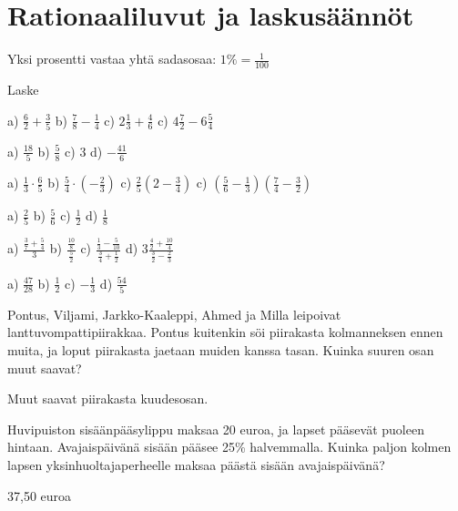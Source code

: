 \chapter{Rationaaliluvut ja laskusäännöt}




Yksi prosentti vastaa yhtä sadasosaa: $1 \% = \frac{1}{100}$

Laske %
\begin{tehtava}
a) $\frac{6}{2} + \frac{3}{5}$
b) $\frac{7}{8} - \frac{1}{4}$
c) $2 \frac{1}{3} + \frac{4}{6}$
c) $4 \frac{7}{2} - 6 \frac{5}{4}$
\begin{vastaus}
a) $\frac{18}{5}$
b) $\frac{5}{8}$
c) $3$
d) $-\frac{41}{6}$
\end{vastaus}
\end{tehtava}

\begin{tehtava}
a) $\frac{1}{3} \cdot \frac{6}{5}$
b) $\frac{5}{4} \cdot (-\frac{2}{3})$
c) $\frac{2}{5} (2 - \frac{3}{4})$
c) $(\frac{5}{6} - \frac{1}{3})(\frac{7}{4} - \frac{3}{2})$
\begin{vastaus}
a) $\frac{2}{5}$
b) $\frac{5}{6}$
c) $\frac{1}{2}$
d) $\frac{1}{8}$
\end{vastaus}
\end{tehtava}

\begin{tehtava} %
a) $ \frac{\frac{3}{7} + \frac{5}{4}}{3}$
b) $ \frac{\frac{10}{8}}{\frac{5}{2}}$
c) $ \frac{\frac{1}{3} - \frac{5}{10}}{\frac{3}{4} + \frac{1}{2}}$
d) $ 3\frac{\frac{4}{2} + \frac{10}{4}}{\frac{3}{2} - \frac{2}{3}}$
\begin{vastaus}
a) $\frac{47}{28}$
b) $\frac{1}{2}$
c) $-\frac{1}{3}$
d) $\frac{54}{5}$
\end{vastaus}
\end{tehtava}

\begin{tehtava} %
Pontus, Viljami, Jarkko-Kaaleppi, Ahmed ja Milla leipoivat lanttuvompattipiirakkaa. Pontus kuitenkin söi piirakasta kolmanneksen ennen muita, ja loput piirakasta jaetaan muiden kanssa tasan. Kuinka suuren osan muut saavat?
\begin{vastaus}
Muut saavat piirakasta kuudesosan.
\end{vastaus}
\end{tehtava}

\begin{tehtava} %
Huvipuiston sisäänpääsylippu maksaa 20 euroa, ja lapset pääsevät puoleen hintaan. Avajaispäivänä sisään pääsee 25\% halvemmalla. Kuinka paljon kolmen lapsen yksinhuoltajaperheelle maksaa päästä sisään avajaispäivänä?
\begin{vastaus}
37,50 euroa
\end{vastaus}
\end{tehtava}

